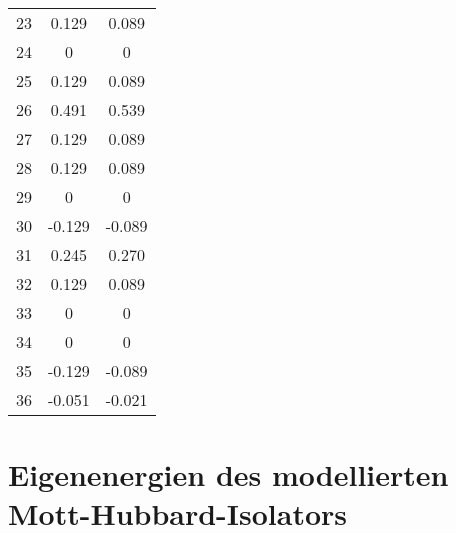 \begin{table}
\begin{minipage}[t]{0.35\linewidth}
\begin{tabular}{S[table-format=2.0] S[table-format=2.3] S[table-format=2.3]}
      23 &  0.129 &  0.089 \\
      24 &      0 &      0 \\
      25 &  0.129 &  0.089 \\
      26 &  0.491 &  0.539 \\
      27 &  0.129 &  0.089 \\
      28 &  0.129 &  0.089 \\
      29 &      0 &      0 \\
      30 & -0.129 & -0.089 \\
      31 &  0.245 &  0.270 \\
      32 &  0.129 &  0.089 \\
      33 &      0 &      0 \\
      34 &      0 &      0 \\
      35 & -0.129 & -0.089 \\
      36 & -0.051 & -0.021 \\
      \bottomrule
    \end{tabular}
  \end{minipage}
  \label{tab:Upsi0}
\end{table}

\newpage

\section{Eigenenergien des modellierten Mott-Hubbard-Isolators}

